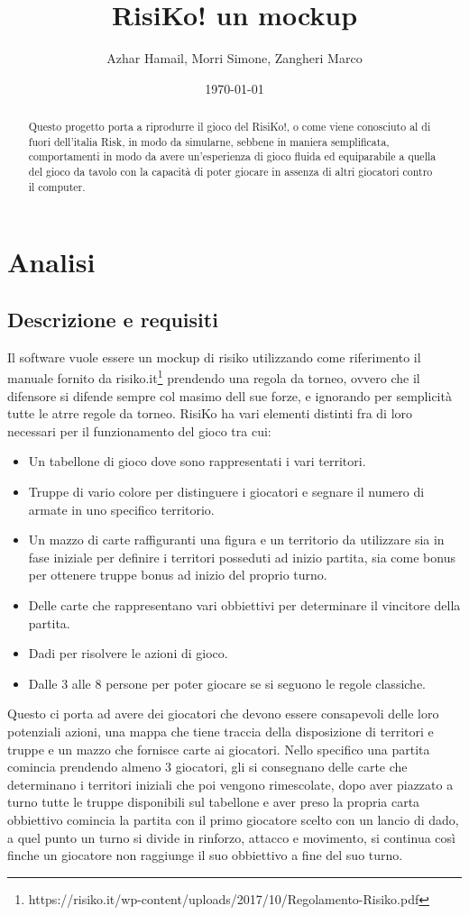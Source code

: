 \documentclass[a4paper,12pt]{report}
\title{RisiKo! un mockup}
\author{Azhar Hamail, Morri Simone, Zangheri Marco}
\date{\today}
\begin{document}
\maketitle

\begin{abstract}
Questo progetto porta a riprodurre il gioco del RisiKo!, o come viene conosciuto al di fuori dell'italia Risk, in modo da simularne, sebbene in maniera semplificata, comportamenti in modo da avere un'esperienza di gioco fluida ed equiparabile a quella del gioco da tavolo con la capacità di poter giocare in assenza di altri giocatori contro il computer.
\end{abstract}

\tableofcontents

\chapter{Analisi}
\section{Descrizione e requisiti}
Il software vuole essere un mockup di risiko utilizzando come riferimento il manuale fornito da risiko.it\footnote{https://risiko.it/wp-content/uploads/2017/10/Regolamento-Risiko.pdf} prendendo una regola da torneo, ovvero che il difensore si difende sempre col masimo dell sue forze, e ignorando per semplicità tutte le atrre regole da torneo.
\newline RisiKo ha vari elementi distinti fra di loro necessari per il funzionamento del gioco tra cui:
\begin{itemize}
\item Un tabellone di gioco dove sono rappresentati i vari territori.
\item Truppe di vario colore per distinguere i giocatori e segnare il numero di armate in uno specifico territorio.
\item Un mazzo di carte raffiguranti una figura e un territorio da utilizzare sia in fase iniziale per definire i territori posseduti ad inizio partita, sia come bonus per ottenere truppe bonus ad inizio del proprio turno.
\item Delle carte che rappresentano vari obbiettivi per determinare il vincitore della partita.
\item Dadi per risolvere le azioni di gioco.
\item Dalle 3 alle 8 persone per poter giocare se si seguono le regole classiche.
\end{itemize}
Questo ci porta ad avere dei giocatori che devono essere consapevoli delle loro potenziali azioni, una mappa che tiene traccia della disposizione di territori e truppe e un mazzo che fornisce carte ai giocatori.
\newline Nello specifico una partita comincia prendendo almeno 3 giocatori, gli si consegnano delle carte che determinano i territori iniziali che poi vengono rimescolate, dopo aver piazzato a turno tutte le truppe disponibili sul tabellone e aver preso la propria carta obbiettivo comincia la partita con il primo giocatore scelto con un lancio di dado, a quel punto un turno si divide in rinforzo, attacco e movimento, si continua così finche un giocatore non raggiunge il suo obbiettivo a fine del suo turno.
\end{document}
